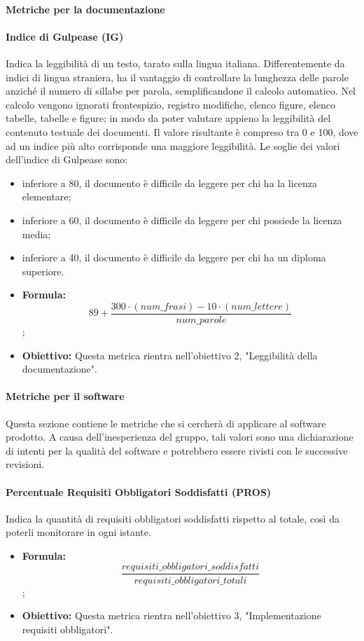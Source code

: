 	\paragraph{Metriche per la documentazione}
	
	\paragraph{Indice di Gulpease (IG)}
	Indica la leggibilità di un testo, tarato sulla lingua italiana. Differentemente da indici di lingua straniera, ha il vantaggio di controllare la lunghezza delle parole anziché il numero di sillabe per parola, semplificandone il calcolo automatico.
	Nel calcolo vengono ignorati frontespizio, registro modifiche, elenco figure, elenco tabelle, tabelle e figure; in modo da poter valutare appieno la leggibilità del contenuto testuale dei documenti.
	Il valore risultante è compreso tra 0 e 100, dove ad un indice più alto corrisponde una maggiore leggibilità.
	Le soglie dei valori dell'indice di Gulpease sono:
	\begin{itemize}
		\item inferiore a 80, il documento è difficile da leggere per chi ha la licenza elementare;
		\item inferiore a 60, il documento è difficile da leggere per chi possiede la licenza media;
		\item inferiore a 40, il documento è difficile da leggere per chi ha un diploma superiore.
	\end{itemize}
	\begin{itemize}
		\item \textbf{Formula:}\[
		89+ \frac{300\cdot (num\_frasi) - 10\cdot (num\_lettere)}{num\_parole}
		\];
		\item \textbf{Obiettivo:} Questa metrica rientra nell'obiettivo 2, "Leggibilità della documentazione".
	\end{itemize}
	
	
	\paragraph{Metriche per il software}
	Questa sezione contiene le metriche che si cercherà di applicare al software prodotto. A causa dell'inesperienza del gruppo, tali valori sono una dichiarazione di intenti per la qualità del software e potrebbero essere rivisti con le successive revisioni.
	
	\paragraph{Percentuale Requisiti Obbligatori Soddisfatti (PROS)}
	Indica la quantità di requisiti obbligatori soddisfatti rispetto al totale, così da poterli monitorare in ogni istante.
	\begin{itemize}
		\item \textbf{Formula:}\[\frac{requisiti\_obbligatori\_soddisfatti}{requisiti\_obbligatori\_totali}\];
		\item \textbf{Obiettivo:} Questa metrica rientra nell'obiettivo 3, "Implementazione requisiti obbligatori".
	\end{itemize}
	
